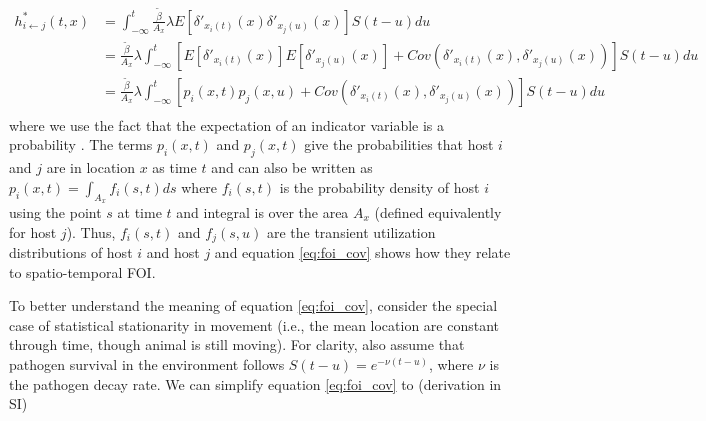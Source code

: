 \documentclass[letterpaper]{article}
\begin{document}
\begin{equation}
    \begin{aligned}
        h^*_{i \leftarrow j}(t, x) &= \int_{-\infty}^{t} \frac{\tilde{\beta}}{A_x} \lambda E[\delta'_{x_i(t)}(x) \delta'_{x_j(u)}(x)] S(t - u) du \\
        &= \frac{\tilde{\beta}}{A_x} \lambda \int_{-\infty}^{t} [E[\delta'_{x_i(t)}(x)] E[\delta'_{x_j(u)}(x)] + Cov(\delta'_{x_i(t)}(x), \delta'_{x_j(u)}(x))] S(t - u) du \\
        &= \frac{\tilde{\beta}}{A_x} \lambda \int_{-\infty}^{t} [p_i(x, t) p_j(x, u) + Cov(\delta'_{x_i(t)}(x), \delta'_{x_j(u)}(x))] S(t - u) du \\
    \end{aligned}
    \label{eq:foi_cov}
\end{equation}
where we use the fact that the expectation of an indicator variable is a probability \citep{Grimmett2001}. The terms $p_i(x, t)$ and $p_j(x, t)$ give the probabilities that host $i$ and $j$ are in location $x$ as time $t$ and can also be written as $p_i(x, t) = \int_{A_x} f_i(s, t) ds$ where $f_i(s, t)$ is the probability density of host $i$ using the point $s$ at time $t$ and integral is over the area $A_x$ (defined equivalently for host $j$). Thus, $f_i(s, t)$ and $f_j(s, u)$ are the transient utilization distributions of host $i$ and host $j$ and equation \ref{eq:foi_cov} shows how they relate to spatio-temporal FOI.



To better understand the meaning of equation \ref{eq:foi_cov}, consider the special case of statistical stationarity in movement (i.e., the mean location are constant through time, though animal is still moving).  For clarity, also assume that pathogen survival in the environment follows $S(t - u) = e^{-\nu (t - u)}$, where $\nu$ is the pathogen decay rate.  We  can simplify equation \ref{eq:foi_cov} to (derivation in SI)
\end{document}
